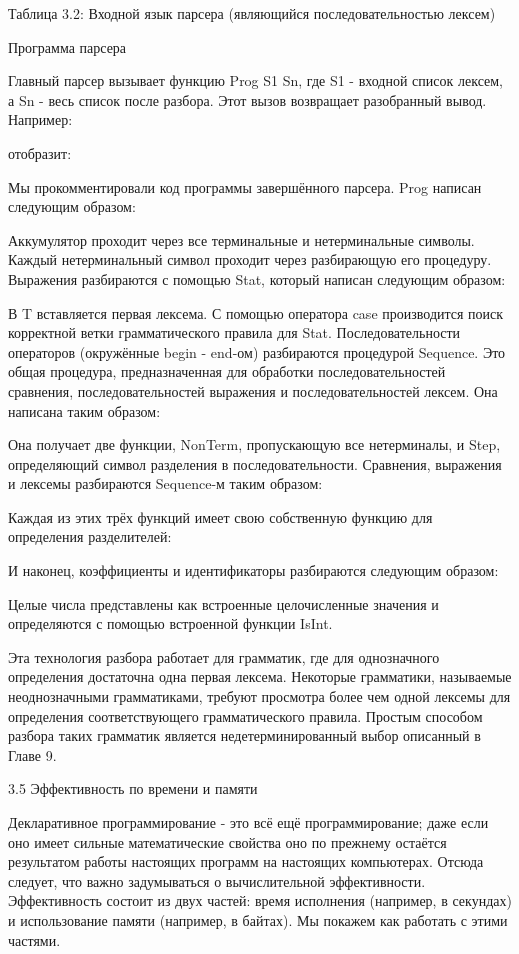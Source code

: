 Таблица 3.2: Входной язык парсера (являющийся последовательностью лексем)

Программа парсера

Главный парсер вызывает функцию {Prog S1 Sn}, где S1 - входной список лексем, а Sn - весь список после разбора. Этот вызов возвращает разобранный вывод. Например:

отобразит:

Мы прокомментировали код программы завершённого парсера. Prog написан следующим образом:

Аккумулятор проходит через все терминальные и нетерминальные символы. Каждый нетерминальный символ проходит через разбирающую его процедуру. Выражения разбираются с помощью Stat, который написан следующим образом:

В T вставляется первая лексема. С помощью оператора case производится поиск корректной ветки грамматического правила для Stat. Последовательности операторов (окружённые begin - end-ом) разбираются процедурой Sequence. Это общая процедура, предназначенная для обработки последовательностей сравнения, последовательностей выражения и последовательностей лексем. Она написана таким образом:

Она получает две функции, NonTerm, пропускающую все нетерминалы, и Step, определяющий символ разделения в последовательности. Сравнения, выражения и лексемы разбираются Sequence-м таким образом:

Каждая из этих трёх функций имеет свою собственную функцию для определения разделителей:

И наконец, коэффициенты и идентификаторы разбираются следующим образом:

Целые числа представлены как встроенные целочисленные значения и определяются с помощью встроенной функции IsInt.

Эта технология разбора работает для грамматик, где для однозначного определения достаточна одна первая лексема. Некоторые грамматики, называемые неоднозначными грамматиками, требуют просмотра более чем одной лексемы для определения соответствующего грамматического правила. Простым способом разбора таких грамматик является недетерминированный выбор описанный в Главе 9.

3.5 Эффективность по времени и памяти

Декларативное программирование - это всё ещё программирование; даже если оно имеет сильные математические свойства оно по прежнему остаётся результатом работы настоящих программ на настоящих компьютерах. Отсюда следует, что важно задумываться о вычислительной эффективности. Эффективность состоит из двух частей: время исполнения (например, в секундах) и использование памяти (например, в байтах). Мы покажем как работать с этими частями.

